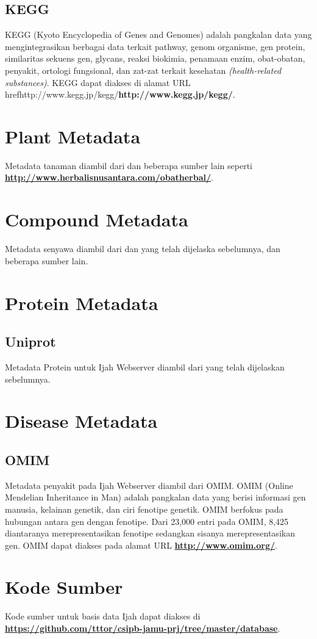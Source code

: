 	\subsection{KEGG} \label{kegg}
	KEGG (Kyoto Encyclopedia of Genes and Genomes) adalah pangkalan data yang mengintegrasikan berbagai data terkait pathway, genom organisme, gen protein, similaritas sekuens gen, glycans, reaksi biokimia, penamaan enzim, obat-obatan, penyakit, ortologi fungsional, dan zat-zat terkait kesehatan \emph{(health-related substances)}. KEGG dapat diakses di alamat URL href{http://www.kegg.jp/kegg/}{\textbf{http://www.kegg.jp/kegg/}}.


\section{Plant Metadata}
	Metadata tanaman diambil dari \textbf{} dan beberapa sumber lain seperti \href{http://www.herbalisnusantara.com/obatherbal/}{\textbf{http://www.herbalisnusantara.com/obatherbal/}}.

\section{Compound Metadata}
	Metadata senyawa diambil dari \textbf{} dan \textbf{} yang telah dijelaska sebelumnya, dan beberapa sumber lain.

\section{Protein Metadata}
	\subsection{Uniprot}
	Metadata Protein untuk Ijah Webserver diambil dari \textbf{} yang telah dijelaskan sebelumnya.

\section{Disease Metadata}
	\subsection{OMIM} \label{omim}
	Metadata penyakit pada Ijah Webserver diambil dari OMIM. OMIM (Online Mendelian Inheritance in Man) adalah pangkalan data yang berisi informasi gen manusia, kelainan genetik, dan ciri fenotipe genetik. OMIM berfokus pada hubungan antara gen dengan fenotipe. Dari 23,000 entri pada OMIM, 8,425 diantaranya merepresentasikan fenotipe sedangkan sisanya merepresentasikan gen. OMIM dapat diakses pada alamat URL \href{http://www.omim.org/}{\textbf{http://www.omim.org/}}.

\section{Kode Sumber} \label{db_source}
Kode sumber untuk basis data Ijah dapat diakses di \href{https://github.com/tttor/csipb-jamu-prj/tree/master/database}{\textbf{https://github.com/tttor/csipb-jamu-prj/tree/master/database}}.